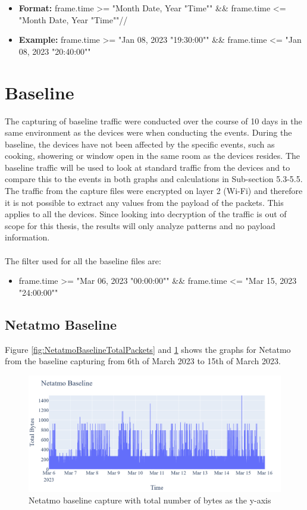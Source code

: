 \begin{itemize}
\item \textbf{Format:} frame.time >= "Month Date, Year "Time"" \&\& frame.time <= "Month Date, Year "Time""//
\item \textbf{Example:} frame.time >= "Jan 08, 2023 "19:30:00"" \&\& frame.time <= "Jan 08, 2023 "20:40:00""
\end{itemize}

\section{Baseline}
The capturing of baseline traffic were conducted over the course of 10 days in the same environment as the devices were when conducting the events. During the baseline, the devices have not been affected by the specific events, such as cooking, showering or window open in the same room as the devices resides. The baseline traffic will be used to look at standard traffic from the devices and to compare this to the events in both graphs and calculations in Sub-section 5.3-5.5. The traffic from the capture files were encrypted on layer 2 (Wi-Fi) and therefore it is not possible to extract any values from the payload of the packets. This applies to all the devices. Since looking into decryption of the traffic is out of scope for this thesis, the results will only analyze patterns and no payload information. 
\\\\
The filter used for all the baseline files are:

\begin{itemize}
\item frame.time >= "Mar 06, 2023 "00:00:00"" \&\& frame.time <= "Mar 15, 2023 "24:00:00""
\end{itemize}

\subsection{Netatmo Baseline}
Figure \ref{fig:NetatmoBaselineTotalPackets} and \ref{fig:NetatmoBaselineTotalBytes} shows the graphs for Netatmo from the baseline capturing from 6th of March 2023 to 15th of March 2023. 
\begin{figure} [H]
    \centering
    \includegraphics[scale=0.3]{figures/Netatmo_Baseline_TotalBytes.png}
    \caption{Netatmo baseline capture with total number of bytes as the y-axis}
    \label{fig:NetatmoBaselineTotalBytes}
\end{figure}

